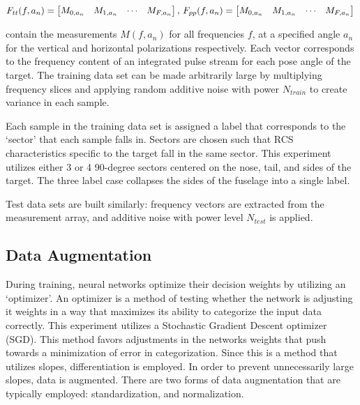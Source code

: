     \begin{equation}\label{eq:F_vec}
      F_{tt}(f, a_n) =
       \begin{bmatrix}
         M_{0, a_n} & M_{1,a_n} & \cdots & M_{F,a_n}
       \end{bmatrix},\,\,
       \\
     F_{pp}(f, a_n) =
      \begin{bmatrix}
        M_{0, a_n} & M_{1,a_n} & \cdots & M_{F,a_n}
      \end{bmatrix}
      \\
    \end{equation}

    contain the measurements $M(f, a_n)$ for all frequencies $f$, at a specified angle $a_n$ for the vertical and horizontal polarizations respectively. Each vector corresponds to the frequency content of an integrated pulse stream for each pose angle of the target. The training data set can be made arbitrarily large by multiplying frequency slices and applying random additive noise with power $N_{train}$ to create variance in each sample.

    Each sample in the training data set is assigned a label that corresponds to the `sector' that each sample falls in. Sectors are chosen such that RCS characteristics specific to the target fall in the same sector. This experiment utilizes either 3 or 4 90-degree sectors centered on the nose, tail, and sides of the target. The three label case collapses the sides of the fuselage into a single label.

    Test data sets are built similarly:  frequency vectors  are extracted from the measurement array, and additive noise with power level $N_{test}$ is applied.

  \subsection{Data Augmentation}
  \label{sec:DA}

    During training, neural networks optimize their decision weights by utilizing an `optimizer'. An optimizer is a method of testing whether the network is adjusting it weights in a way that maximizes its ability to categorize the input data correctly. This experiment utilizes a Stochastic Gradient Descent optimizer (SGD). This method favors adjustments in the networks weights that push towards a minimization of error in categorization. Since this is a method that utilizes slopes, differentiation is employed. In order to prevent unnecessarily large slopes, data is augmented. There are two forms of data augmentation that are typically employed: standardization, and normalization.

